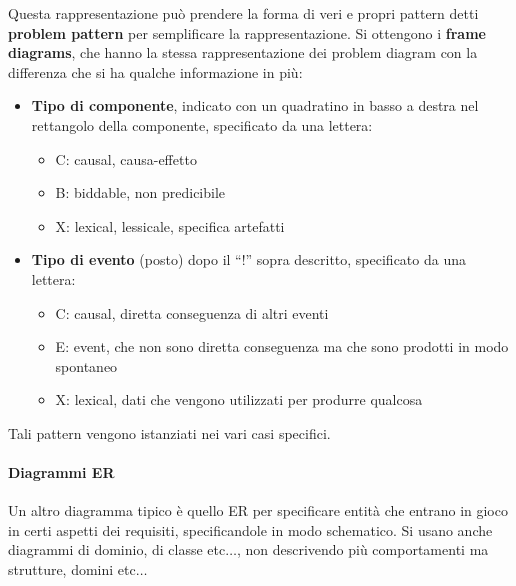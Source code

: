 Questa rappresentazione può prendere la forma di veri e propri pattern detti \textbf{problem pattern} per semplificare la rappresentazione. Si ottengono i \textbf{frame diagrams}, che hanno la stessa rappresentazione dei problem diagram con la differenza che si ha qualche informazione in più:
\begin{itemize}
    \item \textbf{Tipo di componente}, indicato con un quadratino in basso a destra nel rettangolo della componente, specificato da una lettera:
    \begin{itemize}
        \item C: causal, causa-effetto
        \item B: biddable, non predicibile
        \item X: lexical, lessicale, specifica artefatti
    \end{itemize}
    \item \textbf{Tipo di evento} (posto) dopo il “!” sopra descritto, specificato da una lettera:
    \begin{itemize}
        \item C: causal, diretta conseguenza di altri eventi 
        \item E: event, che non sono diretta conseguenza ma che sono prodotti in modo spontaneo
        \item X: lexical, dati che vengono utilizzati per produrre qualcosa
    \end{itemize}
\end{itemize}
Tali pattern vengono istanziati nei vari casi specifici.
\paragraph{Diagrammi ER}
Un altro diagramma tipico è quello ER per specificare entità che entrano in gioco in certi aspetti dei requisiti, specificandole in modo schematico. Si usano anche diagrammi di dominio, di classe etc$\dots$, non descrivendo più comportamenti ma strutture, domini etc$\dots$
